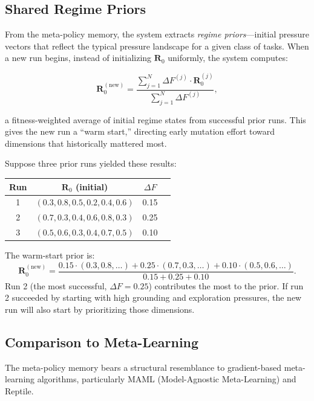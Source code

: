 \subsection{Shared Regime Priors}

From the meta-policy memory, the system extracts \emph{regime priors}---initial pressure vectors that reflect the typical pressure landscape for a given class of tasks. When a new run begins, instead of initializing $\mathbf{R}_0$ uniformly, the system computes:

\begin{equation}
\mathbf{R}_0^{(\text{new})} = \frac{\sum_{j=1}^{N} \Delta F^{(j)} \cdot \mathbf{R}_0^{(j)}}{\sum_{j=1}^{N} \Delta F^{(j)}},
\label{eq:regime-prior}
\end{equation}

a fitness-weighted average of initial regime states from successful prior runs. This gives the new run a ``warm start,'' directing early mutation effort toward dimensions that historically mattered most.

\begin{example}
Suppose three prior runs yielded these results:
\begin{center}
\begin{tabular}{cccc}
\toprule
\textbf{Run} & $\mathbf{R}_0$ (initial) & $\Delta F$ \\
\midrule
1 & $(0.3, 0.8, 0.5, 0.2, 0.4, 0.6)$ & 0.15 \\
2 & $(0.7, 0.3, 0.4, 0.6, 0.8, 0.3)$ & 0.25 \\
3 & $(0.5, 0.6, 0.3, 0.4, 0.7, 0.5)$ & 0.10 \\
\bottomrule
\end{tabular}
\end{center}
The warm-start prior is:
\[
\mathbf{R}_0^{(\text{new})} = \frac{0.15 \cdot (0.3, 0.8, \ldots) + 0.25 \cdot (0.7, 0.3, \ldots) + 0.10 \cdot (0.5, 0.6, \ldots)}{0.15 + 0.25 + 0.10}.
\]
Run 2 (the most successful, $\Delta F = 0.25$) contributes the most to the prior. If run 2 succeeded by starting with high grounding and exploration pressures, the new run will also start by prioritizing those dimensions.
\end{example}

\subsection{Comparison to Meta-Learning}

The meta-policy memory bears a structural resemblance to gradient-based meta-learning algorithms, particularly MAML (Model-Agnostic Meta-Learning) and Reptile.

